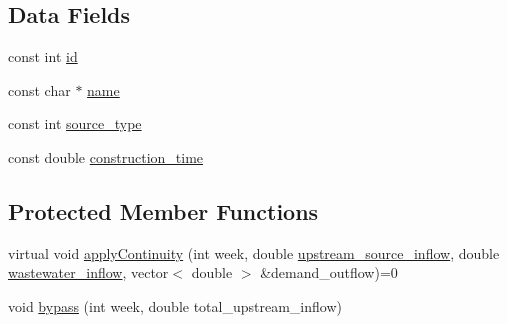 \subsection*{Data Fields}
\begin{DoxyCompactItemize}
\item 
const int \mbox{\hyperlink{classWaterSource_a6eafe5dfefd317877d1244e8a7c6e742_a6eafe5dfefd317877d1244e8a7c6e742}{id}}
\item 
const char $\ast$ \mbox{\hyperlink{classWaterSource_a846ea74c5b453d014f594d41fee8c765_a846ea74c5b453d014f594d41fee8c765}{name}}
\item 
const int \mbox{\hyperlink{classWaterSource_afdd12c29fc74ea21dff1f1be9b8c2b7b_afdd12c29fc74ea21dff1f1be9b8c2b7b}{source\+\_\+type}}
\item 
const double \mbox{\hyperlink{classWaterSource_ae059fbe3f911a819bac0202f7f45e8e4_ae059fbe3f911a819bac0202f7f45e8e4}{construction\+\_\+time}}
\end{DoxyCompactItemize}
\subsection*{Protected Member Functions}
\begin{DoxyCompactItemize}
\item 
virtual void \mbox{\hyperlink{classWaterSource_ac070445379fe706f65b977dade4f3fbc_ac070445379fe706f65b977dade4f3fbc}{apply\+Continuity}} (int week, double \mbox{\hyperlink{classWaterSource_a7a69b2e9b6030f1035e6cf44d2918ee5_a7a69b2e9b6030f1035e6cf44d2918ee5}{upstream\+\_\+source\+\_\+inflow}}, double \mbox{\hyperlink{classWaterSource_aeb5a2d2d83383a70ca20f3e94635a9c7_aeb5a2d2d83383a70ca20f3e94635a9c7}{wastewater\+\_\+inflow}}, vector$<$ double $>$ \&demand\+\_\+outflow)=0
\item 
void \mbox{\hyperlink{classWaterSource_abeb8ba4b51c2b270baf9162df76d8b58_abeb8ba4b51c2b270baf9162df76d8b58}{bypass}} (int week, double total\+\_\+upstream\+\_\+inflow)
\end{DoxyCompactItemize}
